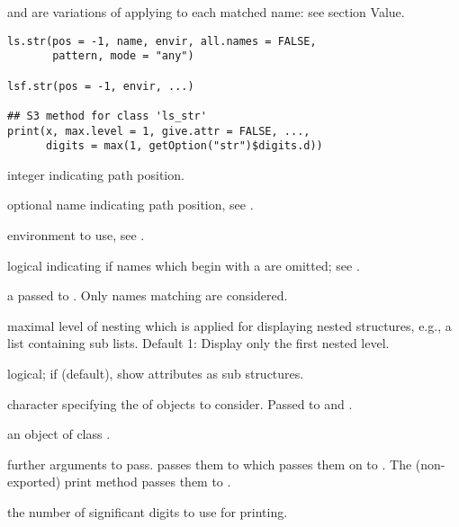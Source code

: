 %
\begin{Description}\relax
{} and  are variations of 
applying  to each matched name: see section Value.
\end{Description}
%
\begin{Usage}
\begin{verbatim}
ls.str(pos = -1, name, envir, all.names = FALSE,
       pattern, mode = "any")

lsf.str(pos = -1, envir, ...)

## S3 method for class 'ls_str'
print(x, max.level = 1, give.attr = FALSE, ...,
      digits = max(1, getOption("str")$digits.d))
\end{verbatim}
\end{Usage}
%
\begin{Arguments}
\begin{ldescription}
\item[\code{pos}] integer indicating  path position.
\item[\code{name}] optional name indicating  path
position, see .
\item[\code{envir}] environment to use, see .
\item[\code{all.names}] logical indicating if names which begin with a
 are omitted; see .
\item[\code{pattern}] a  passed to .
Only names matching  are considered.
\item[\code{max.level}] maximal level of nesting which is applied for
displaying nested structures, e.g., a list containing sub lists.
Default 1: Display only the first nested level.
\item[\code{give.attr}] logical; if  (default), show attributes
as sub structures.
\item[\code{mode}] character specifying the  of objects to
consider.  Passed to  and .
\item[\code{x}] an object of class .
\item[\code{...}] further arguments to pass.   passes them to
 which passes them on to .  The
(non-exported) print method  passes them to
.
\item[\code{digits}] the number of significant digits to use for printing.
\end{ldescription}
\end{Arguments}
